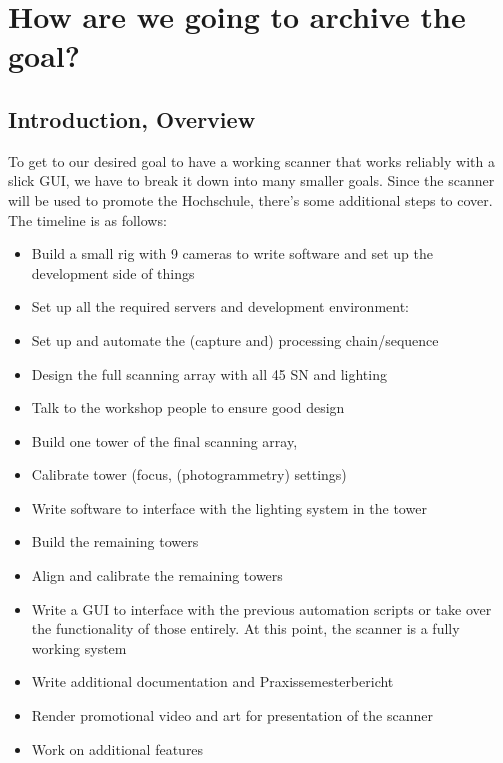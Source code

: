 \section{How are we going to archive the goal?}
\subsection{Introduction, Overview}
	To get to our desired goal to have a working scanner that works reliably with a slick GUI, we have to break it down into many smaller goals. Since the scanner will be used to promote the Hochschule, there's some additional steps to cover.
The timeline is as follows:
\begin{itemize}
	\item Build a small rig with 9 cameras to write software and set up the development side of things
	\item Set up all the required servers and development environment:
	\item Set up and automate the (capture and) processing chain/sequence
	\item Design the full scanning array with all 45 SN and lighting
	\item Talk to the workshop people to ensure good design
	\item Build one tower of the final scanning array, 
	\item Calibrate tower (focus, (photogrammetry) settings)
	\item Write software to interface with the lighting system in the tower
	\item Build the remaining towers
	\item Align and calibrate the remaining towers 
	\item Write a GUI to interface with the previous automation scripts or take over the functionality of those entirely. At this point, the scanner is a fully working system
	\item Write additional documentation and Praxissemesterbericht
	\item Render promotional video and art for presentation of the scanner
	\item Work on additional features
\end{itemize}

